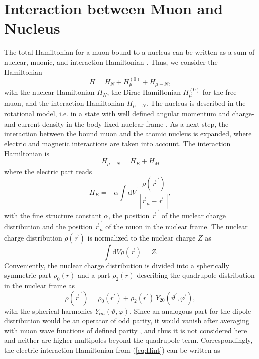 \section{Interaction between Muon and Nucleus}
The total Hamiltonian for a muon bound to a nucleus can be written as a sum of nuclear, muonic, and interaction Hamiltonian \cite{Devons1995}. Thus, we consider the Hamiltonian
\begin{equation}
H = H_{N} + H^{(0)}_{\mu} + H_{\mu - N},
\end{equation}
with the nuclear Hamiltonian $H_{N}$, the Dirac Hamiltonian $H^{(0)}_{\mu}$ for the free muon, and the interaction Hamiltonian $H_{\mu - N}$. The nucleus is described in the rotational model, i.e. in a state with well defined angular momentum and charge- and current density in the body fixed nuclear frame \cite{kozhedub2008}. As a next step, the interaction between the bound muon and the atomic nucleus is expanded, where electric and magnetic interactions are taken into account. The interaction Hamiltonian is
\begin{equation}
\label{eq:Hint}
H_{\mu - N} = H_{E} + H_{M}
\end{equation}
where the electric part reads
\begin{equation}
\label{eq:elInt}
H_{E}= - \alpha \int \mathrm{d}V^{\prime}\, \frac{\rho (\vec{r}^{\,\prime})}{|\vec{r}_{\mu}-\vec{r}^{\,\prime}|} ,
\end{equation}
with the fine structure constant $\alpha$, the position $\vec{r}^{\,\prime}$ of the nuclear charge distribution and the position $\vec{r}_{\mu}^{\,\prime}$ of the muon in the nuclear frame. The nuclear charge distribution $\rho(\vec{r})$ is normalized to the nuclear charge $Z$ as
\begin{equation}
\label{eq:norm}
\int \mathrm{d}V\rho(\vec{r}) = Z.
\end{equation}
Conveniently, the nuclear charge distribution is divided into a spherically symmetric part $\rho_0(r)$ and a part $\rho_2(r)$ describing the quadrupole distribution in the nuclear frame as \cite{hitlin1970}
\begin{equation}
\label{eq:rho}
\rho(\vec{r}^{\,\prime}) = \rho_0(r^{\prime}) + \rho_2(r^{\prime}) \, Y_{20}(\vartheta^\prime,\varphi^\prime),
\end{equation}
with the spherical harmonics $Y_{lm}(\vartheta,\varphi)$. Since an analogous part for the dipole distribution would be an operator of odd parity, it would vanish after averaging with muon wave functions of defined parity \cite{johnson2007}, and thus it is not considered here and neither are higher multipoles beyond the quadrupole term. Correspondingly, the electric interaction Hamiltonian from (\ref{eq:Hint}) can be written as
